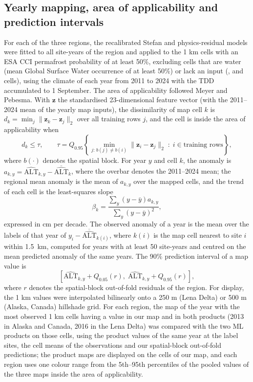 \subsection{Yearly mapping, area of applicability and prediction intervals}
For each of the three regions, the recalibrated Stefan and physics-residual models were fitted to all site-years of the region and applied to the 1 km cells with an ESA CCI permafrost probability of at least 50\%, excluding cells that are water (mean Global Surface Water occurrence of at least 50\%) or lack an input (\nncellmapAk{}, \nncellmapLe{} and \nncellmapCa{} cells), using the climate of each year from 2011 to 2024 with the TDD accumulated to 1 September. The area of applicability followed Meyer and Pebesma\cite{MeyerPebesma2021}. With $\mathbf{z}$ the standardised 23-dimensional feature vector (with the 2011--2024 mean of the yearly map inputs), the dissimilarity of map cell $k$ is $d_k = \min_{j} \lVert \mathbf{z}_k - \mathbf{z}_j \rVert_2$ over all training rows $j$, and the cell is inside the area of applicability when
\begin{equation}
d_k \leq \tau, \qquad \tau = Q_{0.95}\!\left\{ \min_{j:\, b(j) \neq b(i)} \lVert \mathbf{z}_i - \mathbf{z}_j \rVert_2 \;:\; i \in \text{training rows} \right\},
\label{eq:aoa}
\end{equation}
where $b(\cdot)$ denotes the spatial block. For year $y$ and cell $k$, the anomaly is $a_{k,y} = \widehat{\mathrm{ALT}}_{k,y} - \overline{\widehat{\mathrm{ALT}}}_{k}$, where the overbar denotes the 2011--2024 mean; the regional mean anomaly is the mean of $a_{k,y}$ over the mapped cells, and the trend of each cell is the least-squares slope
\begin{equation}
\beta_k = \frac{\sum_{y} \left( y - \bar{y} \right) a_{k,y}}{\sum_{y} \left( y - \bar{y} \right)^{2}},
\label{eq:trend}
\end{equation}
expressed in cm per decade. The observed anomaly of a year is the mean over the labels of that year of $y_i - \overline{\widehat{\mathrm{ALT}}}_{k(i)}$, where $k(i)$ is the map cell nearest to site $i$ within 1.5~km, computed for years with at least 50 site-years and centred on the mean predicted anomaly of the same years. The 90\% prediction interval of a map value is
\begin{equation}
\left[ \widehat{\mathrm{ALT}}_{k,y} + Q_{0.05}(r),\; \widehat{\mathrm{ALT}}_{k,y} + Q_{0.95}(r) \right],
\label{eq:pi}
\end{equation}
where $r$ denotes the spatial-block out-of-fold residuals of the region. For display, the 1 km values were interpolated bilinearly onto a 250 m (Lena Delta) or 500 m (Alaska, Canada) hillshade grid. For each region, the map of the year with the most observed 1 km cells having a value in our map and in both products (2013 in Alaska and Canada, 2016 in the Lena Delta) was compared with the two ML products on those cells, using the product values of the same year at the label sites, the cell means of the observations and our spatial-block out-of-fold predictions; the product maps are displayed on the cells of our map, and each region uses one colour range from the 5th--95th percentiles of the pooled values of the three maps inside the area of applicability.

